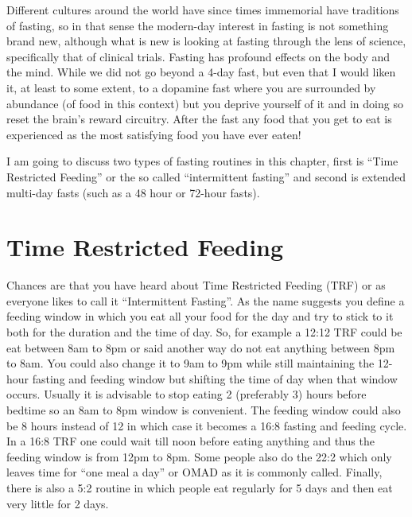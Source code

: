 \documentclass[
  oneside]{book}
\begin{document}
Different cultures around the world have since times immemorial have traditions of fasting, so in that sense the modern-day interest in fasting is not something brand new, although what is new is looking at fasting through the lens of science, specifically that of clinical trials. Fasting has profound effects on the body and the mind. While we did not go beyond a 4-day fast, but even that I would liken it, at least to some extent, to a dopamine fast where you are surrounded by abundance (of food in this context) but you deprive yourself of it and in doing so reset the brain's reward circuitry. After the fast any food that you get to eat is experienced as the most satisfying food you have ever eaten!

I am going to discuss two types of fasting routines in this chapter, first is ``Time Restricted Feeding'' or the so called ``intermittent fasting'' and second is extended multi-day fasts (such as a 48 hour or 72-hour fasts).

\hypertarget{time-restricted-feeding}{%
\section{Time Restricted Feeding}\label{time-restricted-feeding}}

Chances are that you have heard about Time Restricted Feeding (TRF) or as everyone likes to call it ``Intermittent Fasting''. As the name suggests you define a feeding window in which you eat all your food for the day and try to stick to it both for the duration and the time of day. So, for example a 12:12 TRF could be eat between 8am to 8pm or said another way do not eat anything between 8pm to 8am. You could also change it to 9am to 9pm while still maintaining the 12-hour fasting and feeding window but shifting the time of day when that window occurs. Usually it is advisable to stop eating 2 (preferably 3) hours before bedtime so an 8am to 8pm window is convenient. The feeding window could also be 8 hours instead of 12 in which case it becomes a 16:8 fasting and feeding cycle. In a 16:8 TRF one could wait till noon before eating anything and thus the feeding window is from 12pm to 8pm. Some people also do the 22:2 which only leaves time for ``one meal a day'' or OMAD as it is commonly called. Finally, there is also a 5:2 routine in which people eat regularly for 5 days and then eat very little for 2 days.
\end{document}
